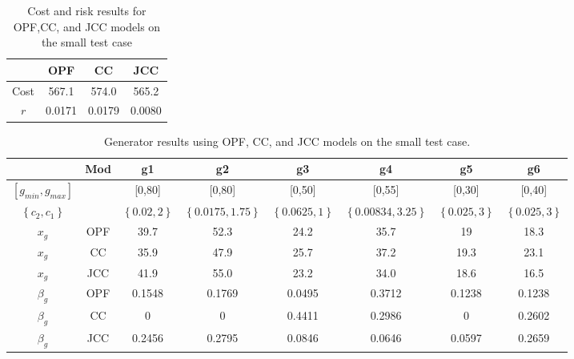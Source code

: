 \begin{table}
\centering
\begin{tabular}{ |c| c c c |}
\hline
& OPF & CC & JCC \\
\hline
\hline
Cost & 567.1 & 574.0 & 565.2\\
$r$ & 0.0171 & 0.0179 & 0.0080\\
\hline
\end{tabular}
\caption{Cost and risk results for OPF,CC, and JCC models on the small test case}\label{solve_results}
\end{table}

\begin{table}
\centering
\small
\begin{tabular}{| c| c |c c c c c c |}
\hline
 & Mod & g1 & g2 & g3 & g4 & g5 & g6 \\
\hline
\hline
$\left[ g_{min}, g_{max} \right]$& & [0,80]&[0,80] &[0,50] &[0,55] &[0,30] &[0,40]  \\
$\left\{ c_2, c_1 \right\}$ && $\left\{0.02,2\right\}$  &$\left\{0.0175,1.75\right\}$ &$\left\{0.0625,1\right\}$ &$\left\{0.00834,3.25\right\}$ &$\left\{0.025,3\right\}$ &$\left\{0.025,3\right\}$  \\
\hline
\hline
$x_g$ &OPF& 39.7  &  52.3  &  24.2  &  35.7  &  19  &  18.3   \\
$x_g$ &CC& 35.9  &  47.9  &  25.7  &  37.2  &  19.3  &  23.1    \\
$x_g$ &JCC& 41.9  &  55.0  &  23.2  &  34.0  &  18.6  &  16.5    \\
\hline
$\beta_g$ &OPF& 0.1548  &  0.1769  &  0.0495  &  0.3712  &  0.1238  &  0.1238    \\
$\beta_g$ &CC& 0  &  0  &  0.4411  &  0.2986  &  0  &  0.2602   \\
$\beta_g$ &JCC& 0.2456  &  0.2795  &  0.0846  &  0.0646  &  0.0597  &  0.2659   \\
\hline
\end{tabular}
\caption{Generator results using OPF, CC, and JCC models on the small test case.}\label{solve_one}
\end{table}

